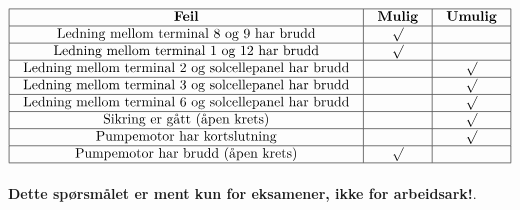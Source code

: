 $$\vbox{\offinterlineskip
\halign{\strut
\vrule \quad\hfil # \ \hfil & 
\vrule \quad\hfil # \ \hfil & 
\vrule \quad\hfil # \ \hfil \vrule \cr
\noalign{\hrule}
%
{\bf Feil} & {\bf Mulig} & {\bf Umulig} \cr
%
\noalign{\hrule}
%
Ledning mellom terminal 8 og 9 har brudd & $\surd$ &  \cr
%
\noalign{\hrule}
%
Ledning mellom terminal 1 og 12 har brudd & $\surd$ &  \cr
%
\noalign{\hrule}
%
Ledning mellom terminal 2 og solcellepanel har brudd &  & $\surd$ \cr
%
\noalign{\hrule}
%
Ledning mellom terminal 3 og solcellepanel har brudd &  & $\surd$ \cr
%
\noalign{\hrule}
%
Ledning mellom terminal 6 og solcellepanel har brudd &  & $\surd$ \cr
%
\noalign{\hrule}
%
Sikring er gått (åpen krets) &  & $\surd$ \cr
%
\noalign{\hrule}
%
Pumpemotor har kortslutning &  & $\surd$ \cr
%
\noalign{\hrule}
%
Pumpemotor har brudd (åpen krets) & $\surd$ &  \cr
%
\noalign{\hrule}
} %
}$$ %








{\bf Dette spørsmålet er ment kun for eksamener, ikke for arbeidsark!}.

